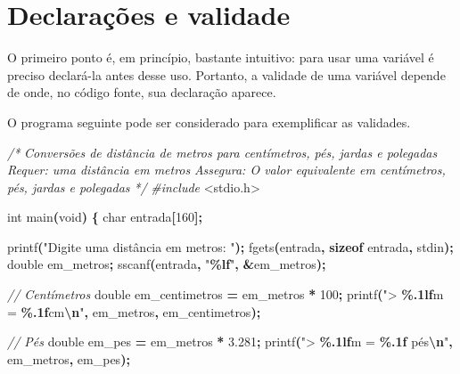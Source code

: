 \documentclass[
  11pt,
  a4paper,
]{scrbook}
\newenvironment{Shaded}{\begin{snugshade}}{\end{snugshade}}
\newcommand{\CommentTok}[1]{\textcolor[rgb]{0.56,0.35,0.01}{\textit{#1}}}
\newcommand{\DataTypeTok}[1]{\textcolor[rgb]{0.13,0.29,0.53}{#1}}
\newcommand{\DecValTok}[1]{\textcolor[rgb]{0.00,0.00,0.81}{#1}}
\newcommand{\FloatTok}[1]{\textcolor[rgb]{0.00,0.00,0.81}{#1}}
\newcommand{\ImportTok}[1]{#1}
\newcommand{\KeywordTok}[1]{\textcolor[rgb]{0.13,0.29,0.53}{\textbf{#1}}}
\newcommand{\NormalTok}[1]{#1}
\newcommand{\OperatorTok}[1]{\textcolor[rgb]{0.81,0.36,0.00}{\textbf{#1}}}
\newcommand{\PreprocessorTok}[1]{\textcolor[rgb]{0.56,0.35,0.01}{\textit{#1}}}
\newcommand{\SpecialCharTok}[1]{\textcolor[rgb]{0.81,0.36,0.00}{\textbf{#1}}}
\newcommand{\StringTok}[1]{\textcolor[rgb]{0.31,0.60,0.02}{#1}}
\begin{document}
\section{Declarações e validade}\label{sec-declaracoes-e-validade}

O primeiro ponto é, em princípio, bastante intuitivo: para usar uma
variável é preciso declará-la antes desse uso. Portanto, a validade de
uma variável depende de onde, no código fonte, sua declaração aparece.

O programa seguinte pode ser considerado para exemplificar as validades.

\begin{Shaded}
\begin{Highlighting}[numbers=left,,]
\CommentTok{/*}
\CommentTok{Conversões de distância de metros para centímetros, pés, jardas e polegadas}
\CommentTok{Requer: uma distância em metros}
\CommentTok{Assegura: O valor equivalente em centímetros, pés, jardas e polegadas}
\CommentTok{*/}
\PreprocessorTok{\#include }\ImportTok{\textless{}stdio.h\textgreater{}}

\DataTypeTok{int}\NormalTok{ main}\OperatorTok{(}\DataTypeTok{void}\OperatorTok{)} \OperatorTok{\{}
    \DataTypeTok{char}\NormalTok{ entrada}\OperatorTok{[}\DecValTok{160}\OperatorTok{];}

\NormalTok{    printf}\OperatorTok{(}\StringTok{"Digite uma distância em metros: "}\OperatorTok{);}
\NormalTok{    fgets}\OperatorTok{(}\NormalTok{entrada}\OperatorTok{,} \KeywordTok{sizeof}\NormalTok{ entrada}\OperatorTok{,}\NormalTok{ stdin}\OperatorTok{);}
    \DataTypeTok{double}\NormalTok{ em\_metros}\OperatorTok{;}
\NormalTok{    sscanf}\OperatorTok{(}\NormalTok{entrada}\OperatorTok{,} \StringTok{"}\SpecialCharTok{\%lf}\StringTok{"}\OperatorTok{,} \OperatorTok{\&}\NormalTok{em\_metros}\OperatorTok{);}

    \CommentTok{// Centímetros}
    \DataTypeTok{double}\NormalTok{ em\_centimetros }\OperatorTok{=}\NormalTok{ em\_metros }\OperatorTok{*} \DecValTok{100}\OperatorTok{;}
\NormalTok{    printf}\OperatorTok{(}\StringTok{"\textgreater{} }\SpecialCharTok{\%.1lf}\StringTok{m = }\SpecialCharTok{\%.1f}\StringTok{cm}\SpecialCharTok{\textbackslash{}n}\StringTok{"}\OperatorTok{,}\NormalTok{ em\_metros}\OperatorTok{,}\NormalTok{ em\_centimetros}\OperatorTok{);}

    \CommentTok{// Pés}
    \DataTypeTok{double}\NormalTok{ em\_pes }\OperatorTok{=}\NormalTok{ em\_metros }\OperatorTok{*} \FloatTok{3.281}\OperatorTok{;}
\NormalTok{    printf}\OperatorTok{(}\StringTok{"\textgreater{} }\SpecialCharTok{\%.1lf}\StringTok{m = }\SpecialCharTok{\%.1f}\StringTok{ pés}\SpecialCharTok{\textbackslash{}n}\StringTok{"}\OperatorTok{,}\NormalTok{ em\_metros}\OperatorTok{,}\NormalTok{ em\_pes}\OperatorTok{);}


\end{Highlighting}
\end{Shaded}
\end{document}
